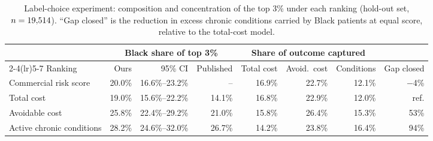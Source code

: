 \begin{table}[t]
\centering
\caption{Label-choice experiment: composition and concentration of the top 3\% under each ranking (hold-out set, $n=19{,}514$). ``Gap closed'' is the reduction in excess chronic conditions carried by Black patients at equal score, relative to the total-cost model.}
\label{tab:labels}
\begin{tabular}{@{}lrrrrrrr@{}}
\toprule
& \multicolumn{3}{c}{Black share of top 3\%} & \multicolumn{3}{c}{Share of outcome captured} & \\
\cmidrule(lr){2-4}\cmidrule(lr){5-7}
Ranking & Ours & 95\% CI & Published & Total cost & Avoid.\ cost & Conditions & Gap closed \\
\midrule
Commercial risk score & 20.0\% & 16.6\%--23.2\% & -- & 16.9\% & 22.7\% & 12.1\% & $-$4\% \\
Total cost & 19.0\% & 15.6\%--22.2\% & 14.1\% & 16.8\% & 22.9\% & 12.0\% & ref. \\
Avoidable cost & 25.8\% & 22.4\%--29.2\% & 21.0\% & 15.8\% & 26.4\% & 15.3\% & 53\% \\
Active chronic conditions & 28.2\% & 24.6\%--32.0\% & 26.7\% & 14.2\% & 23.8\% & 16.4\% & 94\% \\
\bottomrule
\end{tabular}
\end{table}
